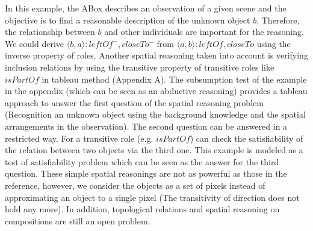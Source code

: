 \documentclass{article}
\begin{document}
In this example, the ABox describes an observation of a given scene and the objective is to find a reasonable description of  the unknown object $b$.
Therefore, the relationship between $b$ and other individuals are important for the reasoning. 
We could derive $\langle b,a\rangle:leftOf^-,closeTo^-$ from $\langle a,b\rangle:leftOf,closeTo$ using the inverse property of roles.
Another spatial reasoning taken into account is verifying inclusion relations by using the transitive property of transitive roles like $isPartOf$ in tableau method (Appendix A). 
The subsumption test of the example in the appendix (which can be seen as an abductive reasoning) provides a tableau approach to answer the first question of the spatial reasoning
problem (Recognition an unknown object using the background knowledge and the spatial arrangements in the observation).
The second question can be answered in a restricted way. For a transitive role (e.g. $isPartOf$) can check the satisfiability of the relation
between two objects via the third one. This example is modeled as a test of satisfiability problem which can be seen as the answer for the third question.
These simple spatial reasonings are not as powerful as those in the reference, however, we consider the objects as a set of pixels instead of approximating an object to a single pixel 
(The transitivity of direction does not hold any more).
In addition, topological relations and spatial reasoning on compositions are still an open problem.
% 
\end{document}
